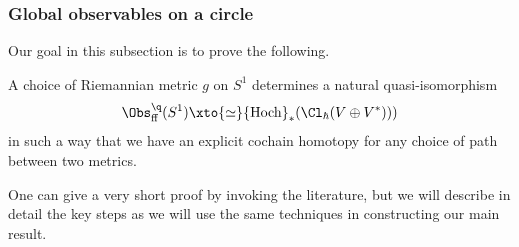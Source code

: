 \documentclass[10pt]{amsart}
\begin{document}
\subsubsection{Global observables on a circle}

Our goal in this subsection is to prove the following.

\begin{lmm}
\label{lem free obs to hoch}
A choice of Riemannian metric $g$ on $S^1$ determines a natural quasi-isomorphism
\[
\Obs^\q_{\rm ff}(S^1) \xto{\simeq} {\rm Hoch}_*(\Cl_\hbar(V \oplus V^*)))
\]
in such a way that we have an explicit cochain homotopy for any choice of path between two metrics.
\end{lmm}

One can give a very short proof by invoking the literature, 
but we will describe in detail the key steps as we will use the same techniques in constructing our  main result.
\end{document}
